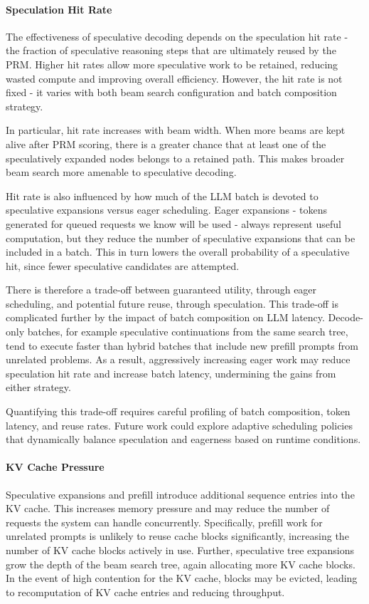 \documentclass[11pt,twoside]{report}
\begin{document}
\paragraph{Speculation Hit Rate}

The effectiveness of speculative decoding depends on the speculation hit rate - the fraction of speculative reasoning steps that are ultimately reused by the PRM.  
Higher hit rates allow more speculative work to be retained, reducing wasted compute and improving overall efficiency.  
However, the hit rate is not fixed - it varies with both beam search configuration and batch composition strategy.

In particular, hit rate increases with beam width.  
When more beams are kept alive after PRM scoring, there is a greater chance that at least one of the speculatively expanded nodes belongs to a retained path.  
This makes broader beam search more amenable to speculative decoding.

Hit rate is also influenced by how much of the LLM batch is devoted to speculative expansions versus eager scheduling.  
Eager expansions - tokens generated for queued requests we know will be used - always represent useful computation, but they reduce the number of speculative expansions that can be included in a batch.  
This in turn lowers the overall probability of a speculative hit, since fewer speculative candidates are attempted.

There is therefore a trade-off between guaranteed utility, through eager scheduling, and potential future reuse, through speculation.  
This trade-off is complicated further by the impact of batch composition on LLM latency.  
Decode-only batches, for example speculative continuations from the same search tree, tend to execute faster than hybrid batches that include new prefill prompts from unrelated problems.  
As a result, aggressively increasing eager work may reduce speculation hit rate and increase batch latency, undermining the gains from either strategy.

Quantifying this trade-off requires careful profiling of batch composition, token latency, and reuse rates.  
Future work could explore adaptive scheduling policies that dynamically balance speculation and eagerness based on runtime conditions.

\paragraph{KV Cache Pressure}
Speculative expansions and prefill introduce additional sequence entries into the KV cache. 
This increases memory pressure and may reduce the number of requests the system can handle concurrently. 
Specifically, prefill work for unrelated prompts is unlikely to reuse cache blocks significantly, increasing the number of KV cache blocks actively in use. 
Further, speculative tree expansions grow the depth of the beam search tree, again allocating more KV cache blocks.
In the event of high contention for the KV cache, blocks may be evicted, leading to recomputation of KV cache entries and reducing throughput.
\end{document}
